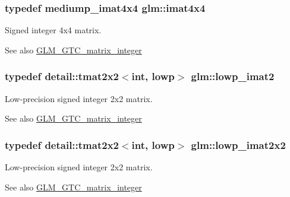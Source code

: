 \subsubsection[{\texorpdfstring{imat4x4}{imat4x4}}]{\setlength{\rightskip}{0pt plus 5cm}typedef mediump\+\_\+imat4x4 {\bf glm\+::imat4x4}}\hypertarget{group__gtc__matrix__integer_ga367d8d5281ff82f1215a227dd2ea5ba9}{}\label{group__gtc__matrix__integer_ga367d8d5281ff82f1215a227dd2ea5ba9}
Signed integer 4x4 matrix. \begin{DoxySeeAlso}{See also}
\hyperlink{group__gtc__matrix__integer}{G\+L\+M\+\_\+\+G\+T\+C\+\_\+matrix\+\_\+integer} 
\end{DoxySeeAlso}
\subsubsection[{\texorpdfstring{lowp\+\_\+imat2}{lowp_imat2}}]{\setlength{\rightskip}{0pt plus 5cm}typedef detail\+::tmat2x2$<$int, lowp$>$ {\bf glm\+::lowp\+\_\+imat2}}\hypertarget{group__gtc__matrix__integer_gae0df4bc278c1a958a32af9ac82c47630}{}\label{group__gtc__matrix__integer_gae0df4bc278c1a958a32af9ac82c47630}
Low-\/precision signed integer 2x2 matrix. \begin{DoxySeeAlso}{See also}
\hyperlink{group__gtc__matrix__integer}{G\+L\+M\+\_\+\+G\+T\+C\+\_\+matrix\+\_\+integer} 
\end{DoxySeeAlso}
\subsubsection[{\texorpdfstring{lowp\+\_\+imat2x2}{lowp_imat2x2}}]{\setlength{\rightskip}{0pt plus 5cm}typedef detail\+::tmat2x2$<$int, lowp$>$ {\bf glm\+::lowp\+\_\+imat2x2}}\hypertarget{group__gtc__matrix__integer_ga05307630bc68a62132a82d1886a0b5e2}{}\label{group__gtc__matrix__integer_ga05307630bc68a62132a82d1886a0b5e2}
Low-\/precision signed integer 2x2 matrix. \begin{DoxySeeAlso}{See also}
\hyperlink{group__gtc__matrix__integer}{G\+L\+M\+\_\+\+G\+T\+C\+\_\+matrix\+\_\+integer} 
\end{DoxySeeAlso}

